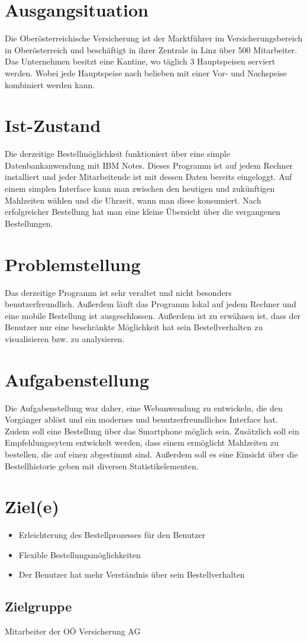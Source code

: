 \section{Ausgangsituation}
\author{Benjamin Besic}
Die Oberösterreichische Versicherung ist der Marktführer im Versicherungsbereich in Oberösterreich 
und beschäftigt in ihrer Zentrale in Linz über 500 Mitarbeiter.
Das Unternehmen besitzt eine Kantine, wo täglich 3 Hauptspeisen serviert werden. Wobei jede Hauptspeise nach belieben 
mit einer Vor- und Nachspeise kombiniert werden kann.
\section{Ist-Zustand}
\author{Benjamin Besic}
Die derzeitige Bestellmöglichkeit funktioniert über eine simple Datenbankanwendung mit IBM Notes.
Dieses Programm ist auf jedem Rechner installiert und jeder Mitarbeitende ist mit dessen Daten bereits eingeloggt.
Auf einem simplen Interface kann man zwischen den heutigen und zukünftigen Mahlzeiten wählen und die Uhrzeit, wann man 
diese konsumiert. Nach erfolgreicher Bestellung hat man eine kleine Übersicht über die vergangenen Bestellungen.
\section{Problemstellung}
\author{Benjamin Besic}
Das derzeitige Programm ist sehr veraltet und nicht besonders benutzerfreundlich. Außerdem
läuft das Programm lokal auf jedem Rechner und eine mobile Bestellung ist ausgeschlossen.
Außerdem ist zu erwähnen ist, dass der Benutzer nur eine beschränkte Möglichkeit hat sein Bestellverhalten 
zu visualisieren bzw. zu analysieren.
\section{Aufgabenstellung}
\author{Benjamin Besic}
Die Aufgabenstellung war daher, eine Webanwendung zu entwickeln, die den Vorgänger ablöst
und ein modernes und benutzerfreundliches Interface hat. Zudem soll eine Bestellung über das Smartphone
möglich sein. Zusätzlich soll ein Empfehlungssytem entwickelt werden, dass einem ermöglicht Mahlzeiten zu 
bestellen, die auf einen abgestimmt sind. Außerdem soll es eine Einsicht über die Bestellhistorie geben
mit diversen Statistikelementen.
\section{Ziel(e)}
\author{Benjamin Besic}
\begin{itemize}
    \item Erleichterung des Bestellprozesses für den Benutzer
    \item Flexible Bestellungsmöglichkeiten
    \item Der Benutzer hat mehr Verständnis über sein Bestellverhalten
\end{itemize}

\subsection{Zielgruppe}
Mitarbeiter der OÖ Versicherung AG


